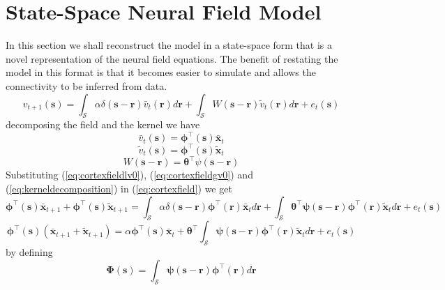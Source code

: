 \documentclass[onecolumn,draftcls]{IEEEtran}
\begin{document}
\section{State-Space Neural Field Model}
In this section we shall reconstruct the model in a state-space form that is a novel representation of the neural field equations. The benefit of restating the model in this format is that it becomes easier to simulate and allows the connectivity to be inferred from data. \begin{equation}
 v_{t+1}(\mathbf s)=\int_{\mathcal S} \alpha \delta(\mathbf s-\mathbf r)\bar v_t(\mathbf r)d \mathbf r+\int_{\mathcal S} W(\mathbf s -\mathbf r)\tilde v_t(\mathbf r)d\mathbf r+e_t(\mathbf s)
\label{eq:cortexfield}
\end{equation}
decomposing the field and the kernel we have
\begin{equation}
\bar v_t(\mathbf s)=\boldsymbol \phi^{\top}(\mathbf s)\bar{\mathbf x}_t
\label{eq:cortexfieldlv0}
\end{equation}
\begin{equation}
\tilde v_t(\mathbf s)=\boldsymbol \phi^{\top}(\mathbf s)\tilde{\mathbf x}_t
\label{eq:cortexfieldgv0}
\end{equation}
\begin{equation}
 W(\mathbf s -\mathbf r)=\boldsymbol \theta^{\top}\psi(\mathbf s -\mathbf r)
\label{eq:kerneldecomposition}
\end{equation}
Substituting (\ref{eq:cortexfieldlv0}), (\ref{eq:cortexfieldgv0}) and (\ref{eq:kerneldecomposition}) in (\ref{eq:cortexfield}) we get
\begin{equation}
 \boldsymbol \phi^{\top}(\mathbf s)\bar{\mathbf x}_{t+1}+\boldsymbol \phi^{\top}(\mathbf s)\tilde{\mathbf x}_{t+1}=
\int_\mathcal{S}\alpha\delta(\mathbf s- \mathbf r)\boldsymbol\phi^{\top}(\mathbf r)\bar{\mathbf x}_td\mathbf r+\int_\mathcal{S}\boldsymbol \theta^{\top}\boldsymbol\psi(\mathbf s -\mathbf r)\boldsymbol\phi^{\top}(\mathbf r)\tilde{\mathbf x}_td\mathbf r+e_t(\mathbf s)
\label{eq:decomposedcortexfield}
\end{equation}
\begin{equation}
 \boldsymbol \phi^{\top}(\mathbf s)(\bar{\mathbf x}_{t+1}+\tilde{\mathbf x}_{t+1})=\alpha \boldsymbol\phi^{\top}(\mathbf s)\bar{\mathbf x}_{t}+\boldsymbol \theta^{\top}\int_{\mathcal S}\boldsymbol\psi(\mathbf s -\mathbf r)\boldsymbol\phi^{\top}(\mathbf r)\tilde{\mathbf x}_td\mathbf r+e_t(\mathbf s)
\end{equation}
by defining
\begin{equation}
 \boldsymbol\Phi(\mathbf s)=\int_{\mathcal S}\boldsymbol\psi(\mathbf s -\mathbf r)\boldsymbol\phi^{\top}(\mathbf r)d\mathbf r
\label{eq:convolution}
\end{equation}
\end{document}
